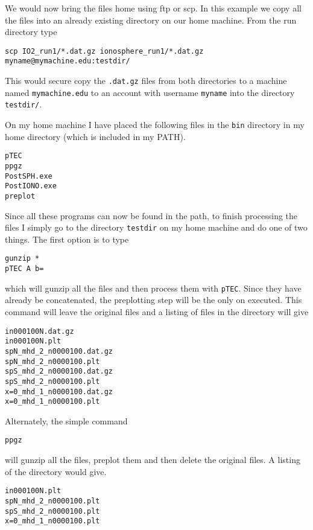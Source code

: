 We would now bring the files home using ftp or scp.  In this example
we copy all the files into an already existing directory on our
home machine.  From the run directory type
\begin{verbatim}
scp IO2_run1/*.dat.gz ionosphere_run1/*.dat.gz myname@mymachine.edu:testdir/
\end{verbatim}
This would secure copy the {\tt .dat.gz} files from both directories to 
a machine named {\tt mymachine.edu} to an account with username {\tt myname}
into the directory {\tt testdir/}.

On my home machine I have placed the following files in the {\tt bin}
directory in my home directory (which is included in my PATH).
\begin{verbatim}
pTEC
ppgz
PostSPH.exe
PostIONO.exe
preplot
\end{verbatim}
Since all these programs can now be found in the path, to finish processing
the files I simply go to the directory {\tt testdir} on my home
machine and do one of two things.  The first option is to type
\begin{verbatim}
gunzip *
pTEC A b=
\end{verbatim}
which will gunzip all the files and then process them with {\tt pTEC}.
Since they have already be concatenated, the preplotting step will be
the only on executed.  This command will leave the original files and a
listing of files in the directory will give
\begin{verbatim}
in000100N.dat.gz
in000100N.plt
spN_mhd_2_n0000100.dat.gz
spN_mhd_2_n0000100.plt
spS_mhd_2_n0000100.dat.gz
spS_mhd_2_n0000100.plt
x=0_mhd_1_n0000100.dat.gz
x=0_mhd_1_n0000100.plt
\end{verbatim}
Alternately, the simple command
\begin{verbatim}
ppgz
\end{verbatim}
will gunzip all the files, preplot them and then delete the original files.
A listing of the directory would give.
\begin{verbatim}
in000100N.plt
spN_mhd_2_n0000100.plt
spS_mhd_2_n0000100.plt
x=0_mhd_1_n0000100.plt
\end{verbatim}

%


